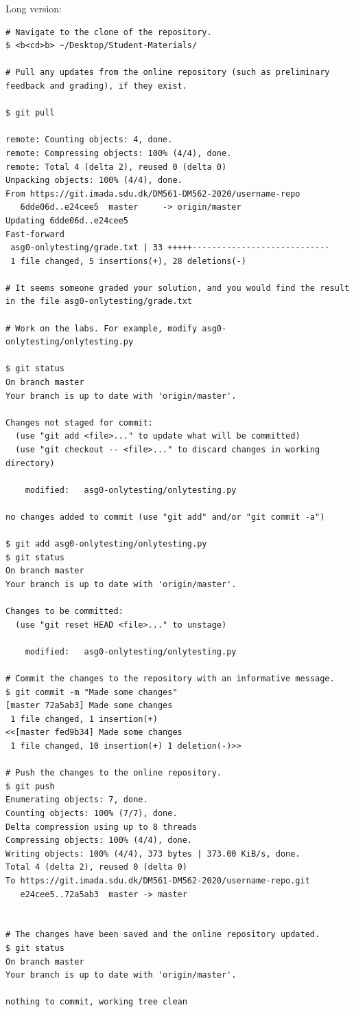 Long version:
\begin{lstlisting}
# Navigate to the clone of the repository.
$ <b<cd>b> ~/Desktop/Student-Materials/

# Pull any updates from the online repository (such as preliminary feedback and grading), if they exist.

$ git pull

remote: Counting objects: 4, done.
remote: Compressing objects: 100% (4/4), done.
remote: Total 4 (delta 2), reused 0 (delta 0)
Unpacking objects: 100% (4/4), done.
From https://git.imada.sdu.dk/DM561-DM562-2020/username-repo
   6dde06d..e24cee5  master     -> origin/master
Updating 6dde06d..e24cee5
Fast-forward
 asg0-onlytesting/grade.txt | 33 +++++----------------------------
 1 file changed, 5 insertions(+), 28 deletions(-)

# It seems someone graded your solution, and you would find the result in the file asg0-onlytesting/grade.txt
 
# Work on the labs. For example, modify asg0-onlytesting/onlytesting.py

$ git status
On branch master
Your branch is up to date with 'origin/master'.

Changes not staged for commit:
  (use "git add <file>..." to update what will be committed)
  (use "git checkout -- <file>..." to discard changes in working directory)

	modified:   asg0-onlytesting/onlytesting.py

no changes added to commit (use "git add" and/or "git commit -a")

$ git add asg0-onlytesting/onlytesting.py
$ git status
On branch master
Your branch is up to date with 'origin/master'.

Changes to be committed:
  (use "git reset HEAD <file>..." to unstage)

	modified:   asg0-onlytesting/onlytesting.py

# Commit the changes to the repository with an informative message.
$ git commit -m "Made some changes"
[master 72a5ab3] Made some changes
 1 file changed, 1 insertion(+)
<<[master fed9b34] Made some changes
 1 file changed, 10 insertion(+) 1 deletion(-)>>

# Push the changes to the online repository.
$ git push
Enumerating objects: 7, done.
Counting objects: 100% (7/7), done.
Delta compression using up to 8 threads
Compressing objects: 100% (4/4), done.
Writing objects: 100% (4/4), 373 bytes | 373.00 KiB/s, done.
Total 4 (delta 2), reused 0 (delta 0)
To https://git.imada.sdu.dk/DM561-DM562-2020/username-repo.git
   e24cee5..72a5ab3  master -> master


# The changes have been saved and the online repository updated.
$ git status
On branch master
Your branch is up to date with 'origin/master'.

nothing to commit, working tree clean
\end{lstlisting}

